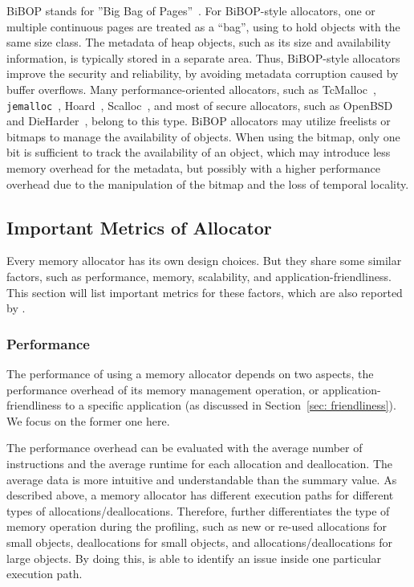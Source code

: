 BiBOP stands for ''Big Bag of Pages''~\citep{hanson1980}. For BiBOP-style allocators, one or multiple continuous pages are treated as a ``bag'', using to hold objects with the same size class. The metadata of heap objects, such as its size and availability information, is typically stored in a separate area. Thus, BiBOP-style allocators improve the security and reliability, by avoiding metadata corruption caused by buffer overflows. Many performance-oriented allocators, such as TcMalloc~\citep{tcmalloc}, \texttt{jemalloc}~\citep{jemalloc}, Hoard~\citep{Hoard}, Scalloc~\citep{Scalloc}, and most of secure allocators, such as OpenBSD~\citep{OpenBSD} and DieHarder~\citep{DieHarder}, belong to this type. BiBOP allocators may utilize freelists or bitmaps to manage the availability of objects. When using the bitmap, only one bit is sufficient to track the availability of an object, which may introduce less memory overhead for the metadata, but possibly with a higher performance overhead due to the manipulation of the bitmap and the loss of temporal locality.  


\subsection{Important Metrics of Allocator}

\label{sec:factors}

Every memory allocator has its own design choices. But they share some similar factors, such as performance, memory, scalability, and application-friendliness. This section will list important metrics for these factors, which are also reported by \MP{}. 

\subsubsection{Performance}
\label{sec:performance}

The performance of using a memory allocator depends on two aspects, the performance overhead of its memory management operation, or application-friendliness to a specific application (as discussed in Section~\ref{sec: friendliness}). We focus on the former one here. 

The performance overhead can be evaluated with the average number of instructions and the average runtime for each allocation and deallocation. The average data is more intuitive and understandable than the summary value. As described above, a memory allocator has different execution paths for different types of allocations/deallocations. Therefore, \MP{} further differentiates the type of memory operation during the profiling, such as new or re-used allocations for small objects, deallocations for small objects, and allocations/deallocations for large objects. By doing this, \MP{} is able to identify an issue inside one particular execution path. 

